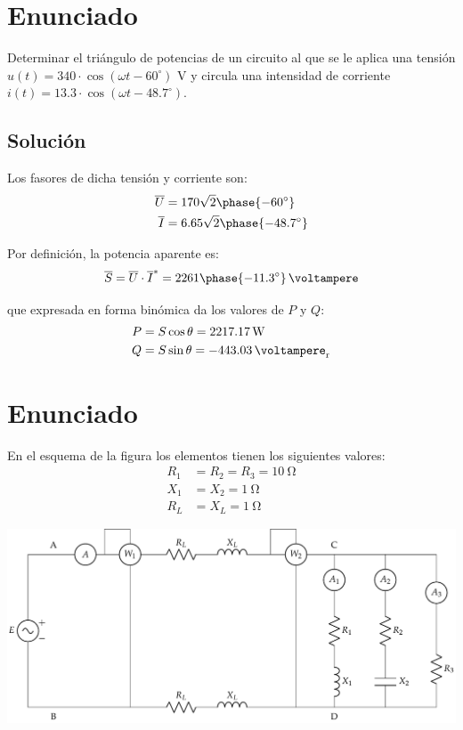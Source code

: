 
\section{Enunciado}

Determinar el triángulo de potencias de un circuito al que se le
aplica una tensión $u(t)=340 \cdot \cos(\omega t - 60^\circ)$ V y
circula una intensidad de corriente
$i(t)= 13.3 \cdot \cos(\omega t-48.7^\circ)$.

\subsection*{Solución}

Los fasores de dicha tensión y corriente son:
\begin{align*}
  \overline{U} &= 170 \sqrt{2}\phase{\ang{-60}}\\
  \overline{I} &= 6.65\sqrt{2}\phase{\ang{-48.7}}
\end{align*}

Por definición, la potencia aparente es:
\begin{equation*}
  \overline{S} = \overline{U}\cdot\overline{I}^* = \qty[parse-numbers=false]{2261\phase{\ang{-11.3}}}{\voltampere}
\end{equation*}

que expresada en forma binómica da los valores de $P$ y $Q$:
\begin{align*}
  P &= S \cos \theta = \qty{2217.17}{\watt}\\
  Q &= S \sin \theta = \qty{-443.03}{\voltampere_r}
\end{align*}


\section{Enunciado}

En el esquema de la figura los elementos tienen los siguientes valores:
\begin{align*}
  R_1 &= R_2 = R_3 = \qty{10}{\ohm}\\
  X_1 &= X_2 = \qty{1}{\ohm}\\
  R_L &= X_L = \qty{1}{\ohm}
\end{align*}

\begin{center}
  \includegraphics[width=0.85\linewidth]{figuras/BT2_08.pdf}
\end{center}


